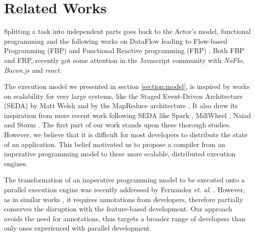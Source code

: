 \section{Related Works} \label{section:related}

Splitting a task into independent parts goes back to the Actor's model, functional programming \cite{Hughes1989} and the following works on Data\-Flow leading to Flow-based Programming (FBP) and Functional Reactive program\-ming (FRP) \cite{Elliott1997}.
Both FBP and FRP, recently got some attention in the Javascript community with \textit{NoFlo}, \textit{Bacon.js} and \textit{react}.

The execution model we presented in section \ref{section:model}, is inspired by works on scalability for very large systems, like the Staged Event-Driven Architecture (SEDA) by Matt Welsh \cite{Welsh2000} and by the MapReduce architecture \cite{Dean2008}.
It also drew its inspiration from more recent work following SEDA like Spark \cite{Zaharia2012}, MillWheel \cite{Akidau2013}, Naiad \cite{McSherry} and Storm \cite{Toshniwal2014}.
The first part of our work stands upon these thorough studies.
However, we believe that it is difficult for most developers to distribute the state of an application.
This belief motivated us to propose a compiler from an imperative programming model to these more scalable, distributed execution engines.


The transformation of an imperative programming model to be executed onto a parallel execution engine was recently addressed by Fernandez \textit{et. al.} \cite{Fernandez2014a}.
However, as in similar works \cite{Power2010}, it requires annotations from developers, therefore partially conserves the disruption with the feature-based development.
Our approach avoids the need for annotations, thus targets a broader range of developers than only ones experienced with parallel development.

